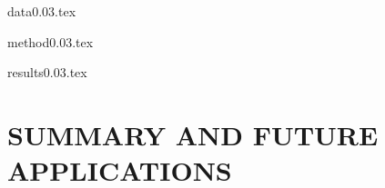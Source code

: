 \documentclass[useAMS,usenatbib]{mn2e}
\begin{document}
{data0.03.tex}


{method0.03.tex}

{results0.03.tex}


\section{SUMMARY AND FUTURE APPLICATIONS}
\label{sec: summary}
\end{document}
